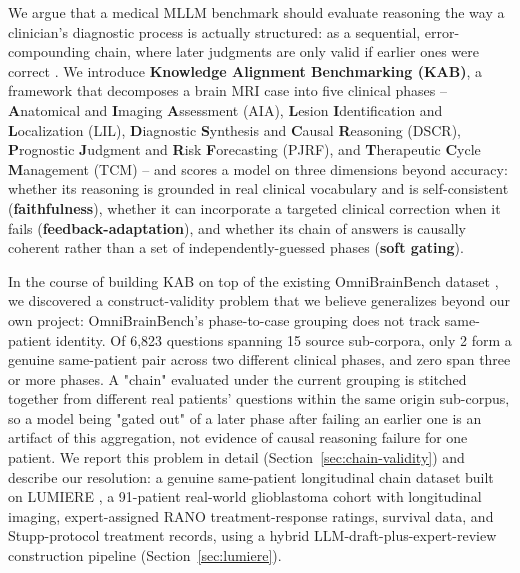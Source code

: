 \documentclass[11pt]{article}
\begin{document}
We argue that a medical MLLM benchmark should evaluate reasoning the way a clinician's diagnostic process is actually structured: as a sequential, error-compounding chain, where later judgments are only valid if earlier ones were correct \citep{croskerry2009clinical}. We introduce \textbf{Knowledge Alignment Benchmarking (KAB)}, a framework that decomposes a brain MRI case into five clinical phases -- \textbf{A}natomical and \textbf{I}maging \textbf{A}ssessment (AIA), \textbf{L}esion \textbf{I}dentification and \textbf{L}ocalization (LIL), \textbf{D}iagnostic \textbf{S}ynthesis and \textbf{C}ausal \textbf{R}easoning (DSCR), \textbf{P}rognostic \textbf{J}udgment and \textbf{R}isk \textbf{F}orecasting (PJRF), and \textbf{T}herapeutic \textbf{C}ycle \textbf{M}anagement (TCM) -- and scores a model on three dimensions beyond accuracy: whether its reasoning is grounded in real clinical vocabulary and is self-consistent (\textbf{faithfulness}), whether it can incorporate a targeted clinical correction when it fails (\textbf{feedback-adaptation}), and whether its chain of answers is causally coherent rather than a set of independently-guessed phases (\textbf{soft gating}).

In the course of building KAB on top of the existing OmniBrainBench dataset \citep{peng2026omnibrainbench}, we discovered a construct-validity problem that we believe generalizes beyond our own project: OmniBrainBench's phase-to-case grouping does not track same-patient identity. Of 6,823 questions spanning 15 source sub-corpora, only 2 form a genuine same-patient pair across two different clinical phases, and zero span three or more phases. A "chain" evaluated under the current grouping is stitched together from different real patients' questions within the same origin sub-corpus, so a model being "gated out" of a later phase after failing an earlier one is an artifact of this aggregation, not evidence of causal reasoning failure for one patient. We report this problem in detail (Section~\ref{sec:chain-validity}) and describe our resolution: a genuine same-patient longitudinal chain dataset built on LUMIERE \citep{suter2022lumiere}, a 91-patient real-world glioblastoma cohort with longitudinal imaging, expert-assigned RANO treatment-response ratings, survival data, and Stupp-protocol treatment records, using a hybrid LLM-draft-plus-expert-review construction pipeline (Section~\ref{sec:lumiere}).
\end{document}
